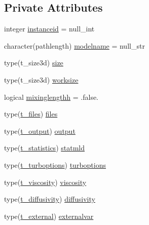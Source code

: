 \subsection*{Private Attributes}
\begin{DoxyCompactItemize}
\item 
integer \mbox{\hyperlink{structmoduleturbulence_1_1t__turbulence_a43c01f66aa9650812257e799ef50f210}{instanceid}} = null\+\_\+int
\item 
character(pathlength) \mbox{\hyperlink{structmoduleturbulence_1_1t__turbulence_a89e55c3eb7eb9bbbd2b5382ed96e1d56}{modelname}} = null\+\_\+str
\item 
type(t\+\_\+size3d) \mbox{\hyperlink{structmoduleturbulence_1_1t__turbulence_ada7de245b506c1669d5c4b5295762098}{size}}
\item 
type(t\+\_\+size3d) \mbox{\hyperlink{structmoduleturbulence_1_1t__turbulence_aa638d6036d573efdd2c3fc405cb03665}{worksize}}
\item 
logical \mbox{\hyperlink{structmoduleturbulence_1_1t__turbulence_aff6c665494ac89a2cae6485fee4fbaa6}{mixinglengthh}} = .false.
\item 
type(\mbox{\hyperlink{structmoduleturbulence_1_1t__files}{t\+\_\+files}}) \mbox{\hyperlink{structmoduleturbulence_1_1t__turbulence_a1140c0b0e093895c507534b2bb2e0695}{files}}
\item 
type(\mbox{\hyperlink{structmoduleturbulence_1_1t__output}{t\+\_\+output}}) \mbox{\hyperlink{structmoduleturbulence_1_1t__turbulence_addd2c458092d5c5e40b021bab5b58ed5}{output}}
\item 
type(\mbox{\hyperlink{structmoduleturbulence_1_1t__statistics}{t\+\_\+statistics}}) \mbox{\hyperlink{structmoduleturbulence_1_1t__turbulence_a614c5ec94694c0bd605ca7189ee84ee4}{statmld}}
\item 
type(\mbox{\hyperlink{structmoduleturbulence_1_1t__turboptions}{t\+\_\+turboptions}}) \mbox{\hyperlink{structmoduleturbulence_1_1t__turbulence_ac972b41d6371d085f29b57dfbfae801b}{turboptions}}
\item 
type(\mbox{\hyperlink{structmoduleturbulence_1_1t__viscosity}{t\+\_\+viscosity}}) \mbox{\hyperlink{structmoduleturbulence_1_1t__turbulence_a13cae45c1ff69316624fd13314164ce2}{viscosity}}
\item 
type(\mbox{\hyperlink{structmoduleturbulence_1_1t__diffusivity}{t\+\_\+diffusivity}}) \mbox{\hyperlink{structmoduleturbulence_1_1t__turbulence_ad00a140c77afd7993360c292cbfb7684}{diffusivity}}
\item 
type(\mbox{\hyperlink{structmoduleturbulence_1_1t__external}{t\+\_\+external}}) \mbox{\hyperlink{structmoduleturbulence_1_1t__turbulence_ab2026509d5c1b7a51594a909954679f4}{externalvar}}

\end{DoxyCompactItemize}
